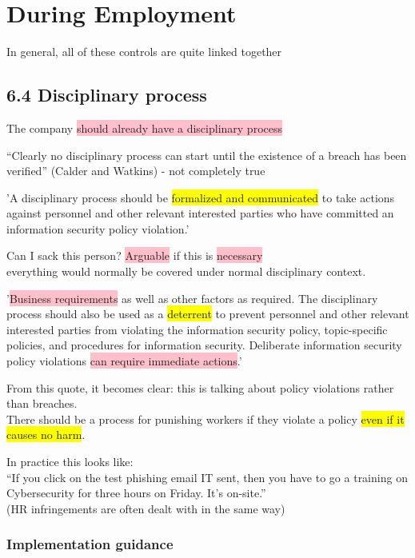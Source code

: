 \documentclass[tikz,border=10pt]{project_plan}
\begin{document}
\section{During Employment}

In general, all of these controls are quite linked together

\subsection{6.4 Disciplinary process}

The company \colorbox{pink}{should already have a disciplinary process}

“Clearly no disciplinary process can start until the existence of a breach
has been verified” (Calder and Watkins) - not completely true

'A disciplinary process should be \colorbox{yellow}{formalized and communicated} to take actions
against personnel and other relevant interested parties who have committed
an information security policy violation.'

Can I sack this person? \colorbox{pink}{Arguable} if this is \colorbox{pink}{necessary}\\
everything would normally be covered under normal disciplinary context.

'\colorbox{pink}{Business requirements} as well as other factors as required. The
disciplinary process should also be used as a \colorbox{yellow}{deterrent} to prevent personnel
and other relevant interested parties from violating the information security
policy, topic-specific policies, and procedures for information security.
Deliberate information security policy violations \colorbox{pink}{can require immediate actions}.'

From this quote, it becomes clear: this is talking about policy violations rather than breaches. \\
There should be a process for punishing workers if they violate a policy \colorbox{yellow}{even if it causes no harm}.

In practice this looks like:\\
“If you click on the test phishing email IT sent, then you have to go a training
on Cybersecurity for three hours on Friday. It’s on-site.”\\
(HR infringements are often dealt with in the same way)

\subsubsection{Implementation guidance}
\end{document}
